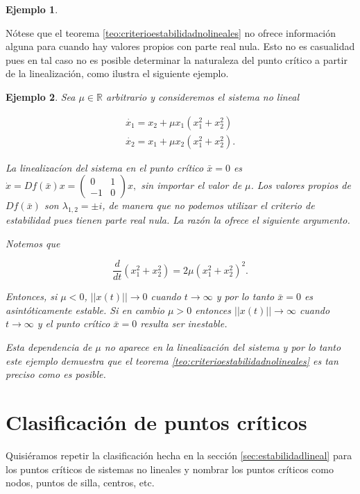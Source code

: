 \documentclass[11pt]{book}
\theoremstyle{definition}
\numberwithin{definition}{section}
\theoremstyle{theorem}
\numberwithin{theorem}{section}
\numberwithin{lemma}{section}
\numberwithin{corollary}{section}
\theoremstyle{plain}
\newtheorem{example}{Ejemplo}
\numberwithin{example}{section}
\newcommand{\R}{{\ensuremath{\mathbb{R}}}}
\begin{document}
\begin{example}
\end{example}

Nótese que el teorema \ref{teo:criterioestabilidadnolineales} no ofrece información alguna para cuando hay valores propios con parte real nula. Esto no es casualidad pues en tal caso no es posible determinar la naturaleza del punto crítico a partir de la linealización, como ilustra el siguiente ejemplo.

\begin{example} \label{ex:nolinealnohiperbolico}
Sea $\mu \in \R$ arbitrario y consideremos el sistema no lineal

$$
	\begin{array}{l}
		\dot{x_1} = x_2 + \mu x_1(x_1^2 + x_2^2) \\
		\dot{x_2} = x_1 + \mu x_2(x_1^2 + x_2^2).
	\end{array}
$$

La linealizacíon del sistema en el punto crítico $\bar{x} = 0$ es $\dot{x} = Df(\bar{x})x = \left( \begin{array}{ll} 0 & 1 \\ -1 & 0 \end{array} \right) x,$ sin importar el valor de $\mu$.
Los valores propios de $Df(\bar{x})$ son $\lambda_{1,2} = \pm i$, de manera que no podemos utilizar el criterio de estabilidad pues tienen parte real nula. La razón la ofrece el siguiente argumento.

Notemos que

$$ \dfrac{d}{dt} (x_1^2 + x_2^2) = 2\mu(x_1^2 + x_2^2)^2. $$

Entonces, si $\mu < 0$, $||x(t)|| \to 0$ cuando $t \to \infty$ y por lo tanto $\bar{x} = 0$ es asintóticamente estable.
Si en cambio $\mu > 0$ entonces $||x(t)|| \to \infty$ cuando $t \to \infty$ y el punto crítico $\bar{x} = 0$ resulta ser inestable.

Esta dependencia de $\mu$ no aparece en la linealización del sistema y por lo tanto este ejemplo demuestra que el teorema \ref{teo:criterioestabilidadnolineales} es tan preciso como es posible.
\end{example}


\section{Clasificación de puntos críticos}

Quisiéramos repetir la clasificación hecha en la sección \ref{sec:estabilidadlineal} para los puntos críticos de sistemas no lineales y nombrar los puntos críticos como nodos, puntos de silla, centros, etc.
\end{document}
